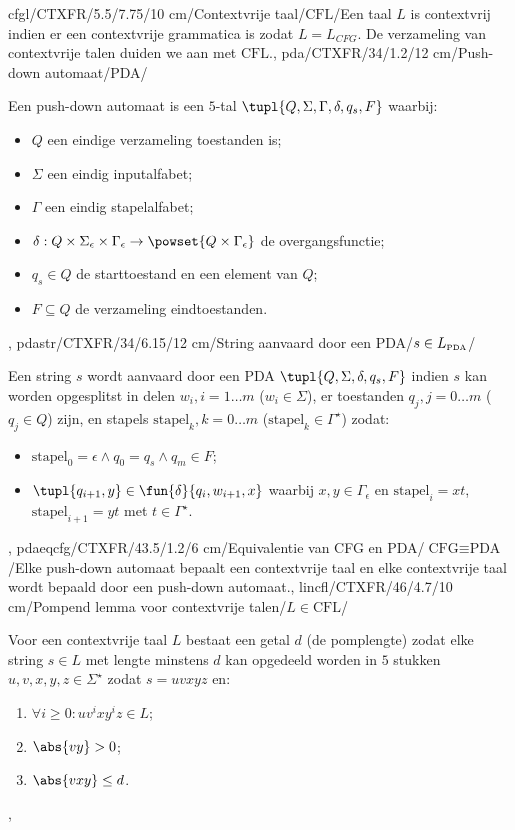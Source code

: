 cfgl/CTXFR/5.5/7.75/10 cm/Contextvrije taal/$\mbox{CFL}$/{Een taal $L$ is contextvrij indien er een contextvrije grammatica is zodat $L=L_{CFG}$. De verzameling van contextvrije talen duiden we aan met $\mbox{CFL}$.},
pda/CTXFR/34/1.2/12 cm/Push-down automaat/PDA/{Een push-down automaat is een $5$-tal $\tupl{Q,\Sigma,\Gamma,\delta,q_s,F}$ waarbij:\begin{itemize}
 \item $Q$ een eindige verzameling toestanden is;
 \item $\Sigma$ een eindig inputalfabet;
 \item $\Gamma$ een eindig stapelalfabet;
 \item $\delta:Q\times\Sigma_{\epsilon}\times\Gamma_{\epsilon}\rightarrow\powset{Q\times\Gamma_{\epsilon}}$ de overgangsfunctie;
 \item $q_s\in Q$ de starttoestand en een element van $Q$;
 \item $F\subseteq Q$ de verzameling eindtoestanden.
\end{itemize}},
pdastr/CTXFR/34/6.15/12 cm/String aanvaard door een PDA/$s\in L_{\mbox{\tiny PDA}}$/{Een string $s$ wordt aanvaard door een PDA $\tupl{Q,\Sigma,\delta,q_s,F}$ indien $s$ kan worden opgesplitst in
delen $w_i,i=1\ldots m$ ($w_i\in\Sigma$), er toestanden $q_j,j=0\ldots m$ ($q_j\in Q$) zijn, en stapels $\mbox{stapel}_k,k=0\ldots m$ ($\mbox{stapel}_k\in\Gamma^{\star}$) zodat:\begin{itemize}
 \item $\mbox{stapel}_0=\epsilon\wedge q_0=q_s\wedge q_m\in F$;
 \item $\tupl{q_{i+1},y}\in\fun{\delta}{q_i,w_{i+1},x}$ waarbij $x,y\in\Gamma_{\epsilon}$ en $\mbox{stapel}_i=xt$, $\mbox{stapel}_{i+1}=yt$ met $t\in\Gamma^{\star}$.
\end{itemize}},
pdaeqcfg/CTXFR/43.5/1.2/6 cm/Equivalentie van CFG en PDA/$\mbox{CFG}\equiv\mbox{PDA}$/{Elke push-down automaat bepaalt een contextvrije taal en elke contextvrije taal wordt bepaald door een push-down automaat.},
lincfl/CTXFR/46/4.7/10 cm/Pompend lemma voor contextvrije talen/$L\in\mbox{CFL}$/{Voor een contextvrije taal $L$ bestaat een getal $d$ (de pomplengte) zodat elke string $s\in L$ met lengte minstens $d$ kan opgedeeld worden in $5$ stukken $u,v,x,y,z\in\Sigma^{\star}$ zodat $s=uvxyz$ en:
\begin{enumerate}
 \item $\forall i\geq 0:uv^ixy^iz\in L$;
 \item $\abs{vy}>0$;
 \item $\abs{vxy}\leq d$.
\end{enumerate}},

